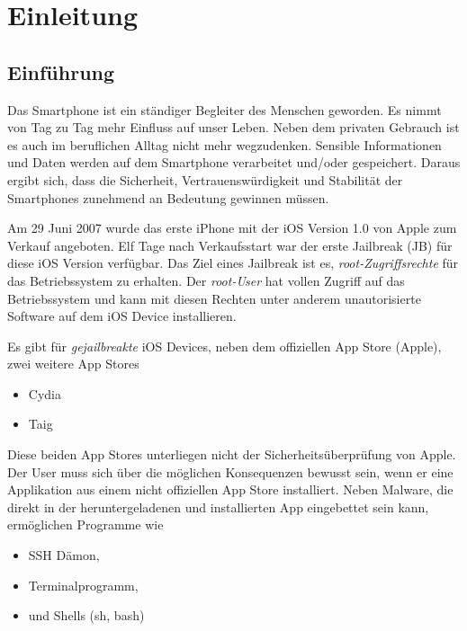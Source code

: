 %
%
%
% 


\chapter{Einleitung}
\label{ch:intro}


\section{Einführung}
\label{sec:Einführung}

Das Smartphone ist ein ständiger Begleiter des Menschen geworden. Es nimmt von Tag zu Tag mehr Einfluss auf unser Leben. Neben dem privaten Gebrauch ist es auch im beruflichen Alltag nicht mehr wegzudenken. Sensible Informationen und Daten werden auf dem Smartphone verarbeitet und/oder gespeichert. Daraus ergibt sich, dass die Sicherheit, Vertrauenswürdigkeit und Stabilität der Smartphones zunehmend an Bedeutung gewinnen müssen.\par 
Am 29 Juni 2007 wurde das erste iPhone mit der iOS Version 1.0 von Apple zum Verkauf angeboten. Elf Tage nach Verkaufsstart war der erste Jailbreak (JB) für diese iOS Version verfügbar. Das Ziel eines Jailbreak ist es, \textit{\glqq root-Zugriffsrechte\grqq{}} für das Betriebssystem zu erhalten. Der \textit{\glqq root-User\grqq{}} hat vollen Zugriff auf das Betriebssystem und kann mit diesen Rechten unter anderem unautorisierte Software auf dem iOS Device installieren.\par 
Es gibt für \textit{\glqq gejailbreakte\grqq{}} iOS Devices, neben dem offiziellen App Store (Apple), zwei weitere App Stores
\begin{itemize}
    \item Cydia
    \item Taig
\end{itemize}
Diese beiden App Stores unterliegen nicht der Sicherheitsüberprüfung von Apple. Der User muss sich über die möglichen Konsequenzen bewusst sein, wenn er eine Applikation aus einem nicht offiziellen App Store installiert. Neben Malware, die direkt in der heruntergeladenen und installierten App eingebettet sein kann, ermöglichen Programme wie 
\begin{itemize}
    \item SSH Dämon,
    \item Terminalprogramm,
    \item und Shells (sh, bash)
\end{itemize}
